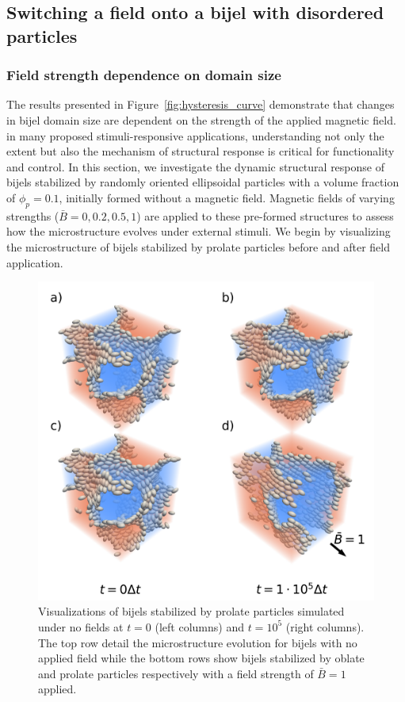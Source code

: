\subsection{Switching a field onto a bijel with disordered particles}
\subsubsection{Field strength dependence on domain size}
\label{section:field-strength-dependence-on-domain-size}

The results presented in Figure~\ref{fig:hysteresis_curve} demonstrate that changes in bijel domain size are dependent on the strength of the applied magnetic 
field. in many proposed stimuli-responsive applications, understanding not only the extent but also the mechanism
of structural response is critical for functionality and control. In this section, we investigate the dynamic structural response of bijels stabilized by randomly 
oriented ellipsoidal particles with a volume fraction of \(\phi_p = 0.1\), initially formed without a magnetic field. Magnetic fields of varying strengths 
(\(\bar{B} = 0, 0.2, 0.5, 1\)) are applied to these pre-formed structures to assess how the microstructure evolves under external stimuli. We begin by visualizing 
the microstructure of bijels stabilized by prolate particles before and after field application.

\begin{figure} 
\centering 
\includegraphics[scale=0.5]{../figures/results/paper2/microstructure_viz-field_on.png} 
\caption{Visualizations of bijels stabilized by prolate particles simulated under no fields at $t = 0$ (left columns) and $t = 10^5$ (right columns). The top 
         row detail the microstructure evolution for bijels with no applied field while the bottom rows show bijels stabilized by oblate and prolate particles 
         respectively with a field strength of $\bar{B} = 1$ applied.}
\label{fig:microstructure_viz-field_on} 
\end{figure}

